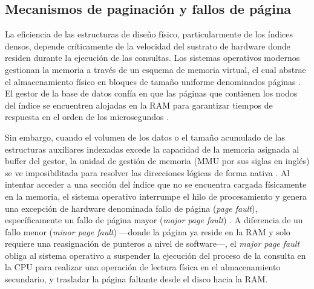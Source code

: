 \documentclass[12pt, letter paper]{report}
\begin{document}
      \subsection{Mecanismos de paginación y fallos de página} %
      \label{sub:mecanismos_de_paginación_y_fallos_de_página}
        La eficiencia de las estructuras de diseño físico, particularmente de
        los índices densos, depende críticamente de la velocidad del sustrato de
        hardware donde residen durante la ejecución de las consultas. Los
        sistemas operativos modernos gestionan la memoria a través de un esquema
        de memoria virtual, el cual abstrae el almacenamiento físico en bloques
        de tamaño uniforme denominados páginas \cite{silberschatz2019operating}.
        El gestor de la base de datos confía en que las páginas que contienen
        los nodos del índice se encuentren alojadas en la RAM para garantizar
        tiempos de respuesta en el orden de los microsegundos
        \cite{elmasri2015fundamentals}.

        Sin embargo, cuando el volumen de los datos o el tamaño acumulado de las
        estructuras auxiliares indexadas excede la capacidad de la memoria
        asignada al buffer del gestor, la unidad de gestión de memoria (MMU por
        sus siglas en inglés) se ve imposibilitada para resolver las direcciones
        lógicas de forma nativa \cite{tanenbaum2014modern}. Al intentar acceder
        a una sección del índice que no se encuentra cargada físicamente en la
        memoria, el sistema operativo interrumpe el hilo de procesamiento y
        genera una excepción de hardware denominada fallo de página
        (\textit{page fault}), específicamente un fallo de página mayor
        (\textit{major page fault}) \cite{silberschatz2019operating}. A
        diferencia de un fallo menor (\textit{minor page fault}) ---donde la
        página ya reside en la RAM y solo requiere una reasignación de punteros
        a nivel de software---, el \textit{major page fault} obliga al sistema
        operativo a suspender la ejecución del proceso de la consulta en la CPU
        para realizar una operación de lectura física en el almacenamiento
        secundario, y trasladar la página faltante desde el disco hacia la RAM.
\end{document}
